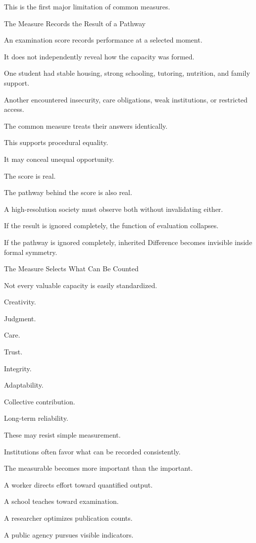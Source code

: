 This is the first major limitation of common measures.

The Measure Records the Result of a Pathway

An examination score records performance at a selected moment.

It does not independently reveal how the capacity was formed.

One student had stable housing, strong schooling, tutoring, nutrition, and family support.

Another encountered insecurity, care obligations, weak institutions, or restricted access.

The common measure treats their answers identically.

This supports procedural equality.

It may conceal unequal opportunity.

The score is real.

The pathway behind the score is also real.

A high-resolution society must observe both without invalidating either.

If the result is ignored completely, the function of evaluation collapses.

If the pathway is ignored completely, inherited Difference becomes invisible inside formal symmetry.

The Measure Selects What Can Be Counted

Not every valuable capacity is easily standardized.

Creativity.

Judgment.

Care.

Trust.

Integrity.

Adaptability.

Collective contribution.

Long-term reliability.

These may resist simple measurement.

Institutions often favor what can be recorded consistently.

The measurable becomes more important than the important.

A worker directs effort toward quantified output.

A school teaches toward examination.

A researcher optimizes publication counts.

A public agency pursues visible indicators.

